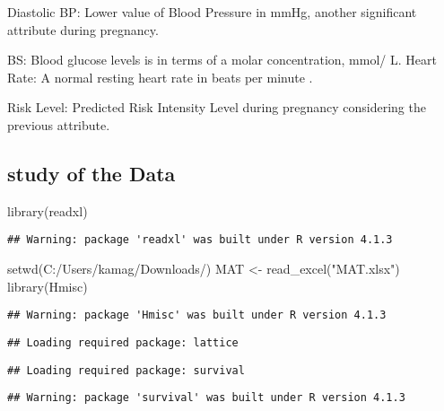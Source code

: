 \documentclass[
]{article}
\newenvironment{Shaded}{\begin{snugshade}}{\end{snugshade}}
\newcommand{\FunctionTok}[1]{\textcolor[rgb]{0.00,0.00,0.00}{#1}}
\newcommand{\NormalTok}[1]{#1}
\newcommand{\OtherTok}[1]{\textcolor[rgb]{0.56,0.35,0.01}{#1}}
\newcommand{\StringTok}[1]{\textcolor[rgb]{0.31,0.60,0.02}{#1}}
\begin{document}
Diastolic BP: Lower value of Blood Pressure in mmHg, another significant
attribute during pregnancy.

BS: Blood glucose levels is in terms of a molar concentration, mmol/ L.
Heart Rate: A normal resting heart rate in beats per minute .

Risk Level: Predicted Risk Intensity Level during pregnancy considering
the previous attribute.

\hypertarget{study-of-the-data}{%
\subsection{study of the Data}\label{study-of-the-data}}

\begin{Shaded}
\begin{Highlighting}[]
\FunctionTok{library}\NormalTok{(readxl)}
\end{Highlighting}
\end{Shaded}

\begin{verbatim}
## Warning: package 'readxl' was built under R version 4.1.3
\end{verbatim}

\begin{Shaded}
\begin{Highlighting}[]
\FunctionTok{setwd}\NormalTok{(}\StringTok{\textquotesingle{}C:/Users/kamag/Downloads/\textquotesingle{}}\NormalTok{)}
\NormalTok{MAT }\OtherTok{\textless{}{-}} \FunctionTok{read\_excel}\NormalTok{(}\StringTok{"MAT.xlsx"}\NormalTok{)}
\FunctionTok{library}\NormalTok{(Hmisc)}
\end{Highlighting}
\end{Shaded}

\begin{verbatim}
## Warning: package 'Hmisc' was built under R version 4.1.3
\end{verbatim}

\begin{verbatim}
## Loading required package: lattice
\end{verbatim}

\begin{verbatim}
## Loading required package: survival
\end{verbatim}

\begin{verbatim}
## Warning: package 'survival' was built under R version 4.1.3
\end{verbatim}
\end{document}
